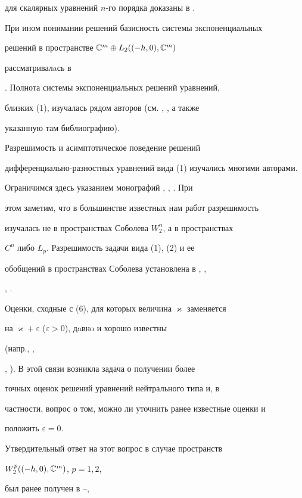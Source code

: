 для скалярных уравнений $n$-го порядка доказаны в \cite{9}. 


При ином понимании решений базисность системы экспоненциальных 


решений в пространстве $\Bbb C^m\oplus L_2((-h,0),\Bbb C^m)$ 


рассматривалaсь в 


\cite{17}. Полнота системы экспоненциальных решений уравнений, 


близких (1), изучалась рядом авторов (см. \cite{18}, \cite{19}, а также 


указанную там библиографию). 


 


Разрешимость и асимптотическое поведение решений 


дифференциально-разностных уравнений вида (1) изучались многими авторами. 


Ограничимся здесь указанием монографий \cite{1}, \cite{3}, \cite{15}. При 


этом заметим, что в большинстве известных нам работ разрешимость 


изучалась не в пространствах Соболева $W^n_2$, а в пространствах 


$C^n$ либо $L_p$. Разрешимость задачи вида (1), (2) и ее 


обобщений в пространствах Соболева установлена в \cite{5}, \cite{11}, 


\cite{12}, \cite{14}. 


 


Оценки, сходные с (6), для которых величина $\varkappa$ заменяется 


на $\varkappa+\varepsilon$ ($\varepsilon>0$), дaвнo и хорошо известны


(напр., \cite{15}, 


\cite{1}, \cite{3}). В этой связи возникла задача о получении более 


точных оценок решений уравнений нейтрального типа и, в 


частности, вопрос о том, можно ли уточнить ранее известные оценки и 


положить $\varepsilon=0$. 


 


Утвердительный ответ на этот вопрос в случае пространств 


$W^p_2((-h,0),\Bbb C^m)$, $p=1,2$, 


был ранее получен в \cite{6}--\cite{8}, 


